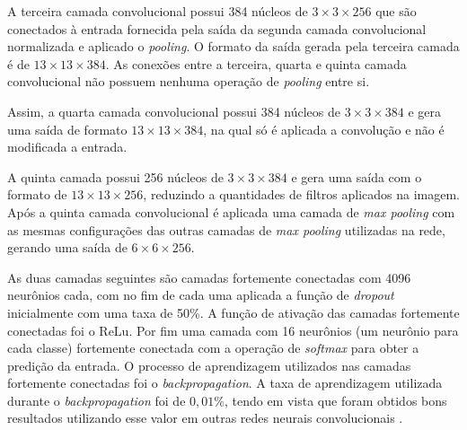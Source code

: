 \par A terceira camada convolucional possui 384 núcleos de $3\times3\times256$ que são conectados à entrada fornecida pela saída da segunda camada convolucional normalizada e aplicado o \textit{pooling}. O formato da saída gerada pela terceira camada é de $13\times13\times384$. As conexões entre a terceira, quarta e quinta camada convolucional não possuem nenhuma operação de \textit{pooling} entre si. 

\par Assim, a quarta camada convolucional possui 384 núcleos de $3\times3\times384$ e gera uma saída de formato $13\times13\times384$, na qual só é aplicada a convolução e não é modificada a entrada.

\par A quinta camada possui 256 núcleos de $3\times3\times384$ e gera uma saída com o formato de $13\times13\times256$, reduzindo a quantidades de filtros aplicados na imagem. Após a quinta camada convolucional é aplicada uma camada de \textit{max pooling} com as mesmas configurações das outras camadas de \textit{max pooling} utilizadas na rede, gerando uma saída de $6\times6\times256$.

\par As duas camadas seguintes são camadas fortemente conectadas com 4096 neurônios cada, com no fim de cada uma aplicada a função de \textit{dropout} inicialmente com uma taxa de 50\%. A função de ativação das camadas fortemente conectadas foi o ReLu. Por fim uma camada com 16 neurônios (um neurônio para cada classe) fortemente conectada com a operação de \textit{softmax} para obter a predição da entrada. O processo de aprendizagem utilizados nas camadas fortemente conectadas foi o \textit{backpropagation}. A taxa de aprendizagem utilizada durante o \textit{backpropagation} foi de $0,01\%$, tendo em vista que foram obtidos bons resultados utilizando esse valor em outras redes neurais convolucionais \cite{imaginetArticle}.

